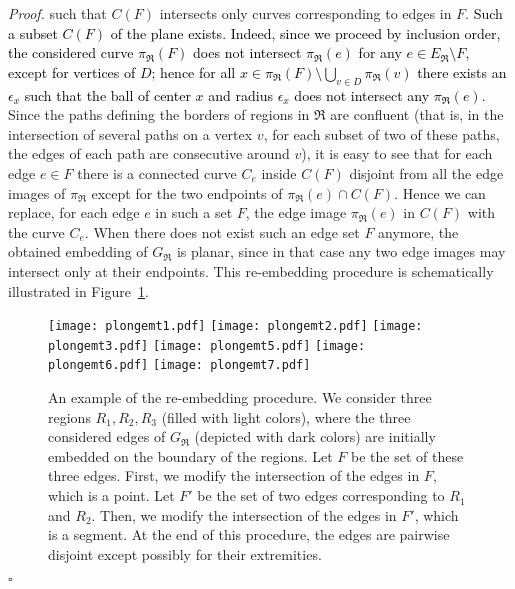 \documentclass[a4paper,11pt]{article}
\newenvironment{proof}{\noindent \textit{Proof. }}{\hfill$\square$\vspace{.2cm}}
\newcommand{\addOK}   [1] {\textcolor{black} {#1}}
\newcommand{\modifOK} [2] {\addOK{#2}}
\newcommand{\ig}[1]{\textcolor{blue}{\fbox{\fbox{\textcolor{blue}{#1}}}}}
\begin{document}
\begin{proof}
such that $C(F)$ intersects only curves corresponding to edges in $F$. \modifOK{; note that such a subset of the plane exists, since $C(F)$ forms a sharp corner around dominating vertices \ig{il faudrait donner un petit argument de pourquoi $C(F)$ fait un ``sharp corner''} and does not contain them, and since we proceed by inclusion order\\ \ig{pourquoi le faire par ``inclusion order'' garantit l'existence d'$\epsilon$?}.}{Such a subset $C(F)$ of the plane exists. Indeed, since we proceed by inclusion order, the considered curve $\pi_\Re(F)$ does not intersect $\pi_\Re(e)$ for any $e \in E_\Re \setminus F$, except for vertices of $D$; hence for all $x \in \pi_\Re(F) \setminus \bigcup_{v \in D} \pi_\Re(v) $ there exists an $\epsilon_x$ such that the ball of center $x$ and radius $\epsilon_x$ does not intersect any $\pi_\Re(e)$.} Since the paths defining the borders of regions in $\Re$ are confluent (that is,  in the intersection of several paths on a vertex $v$, for each subset of two of these paths, the edges of each path are consecutive around $v$), it is easy to see that for each edge $e \in F$ there is a connected curve $C_e$ inside $C(F)$ disjoint from all the edge images of $\pi_\Re$ except for the two endpoints of $\pi_\Re(e) \cap C(F)$. Hence we can replace, for each edge $e$ in such a set $F$, the edge image $\pi_\Re(e)$ in $C(F)$ with the curve $C_e$. When there does not exist such an edge set $F$ anymore, the obtained embedding of $G_\Re$ is planar, since in that case any two edge images may intersect only at their endpoints. This re-embedding procedure is schematically illustrated in Figure~\ref{fig_replonge}.


\begin{figure}[h]
\begin{center}
   \texttt{[image: plongemt1.pdf]}
   \texttt{[image: plongemt2.pdf]}
   \texttt{[image: plongemt3.pdf]}
\texttt{[image: plongemt5.pdf]}
   \texttt{[image: plongemt6.pdf]}
   \texttt{[image: plongemt7.pdf]}

\end{center}
   \caption{An example of the re-embedding procedure. We consider three regions $R_1,R_2,R_3$ (filled with light colors), where the three considered edges of $G_\Re$ (depicted with dark colors) are initially embedded on the boundary of the regions. Let $F$ be the set of these three edges. First, we modify the intersection  of the edges in $F$, which is a point. Let $F'$ be the set of two edges corresponding to $R_1$ and $R_2$. Then, we modify the intersection of the edges in $F'$, which is a segment. At the end of this procedure, the edges are pairwise disjoint except possibly for their extremities.}
   \label{fig_replonge}
\end{figure}


\end{proof}
\end{document}
